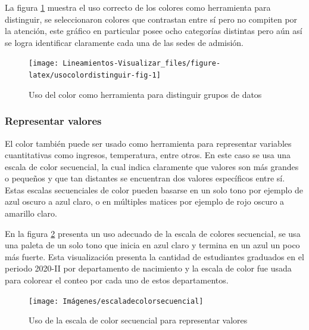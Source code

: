 \documentclass[
]{book}
\begin{document}
La figura \ref{fig:usocolordistinguir-fig} muestra el uso correcto de los colores como herramienta para distinguir, se seleccionaron colores que contrastan entre sí pero no compiten por la atención, este gráfico en particular posee ocho categorías distintas pero aún así se logra identificar claramente cada una de las sedes de admisión.

\begin{figure}

{\centering \texttt{[image: Lineamientos-Visualizar\_files/figure-latex/usocolordistinguir-fig-1]} 

}

\caption{Uso del color como herramienta para distinguir grupos de datos}\label{fig:usocolordistinguir-fig}
\end{figure}

\hypertarget{representar-valores}{%
\subsubsection{Representar valores}\label{representar-valores}}

El color también puede ser usado como herramienta para representar variables cuantitativas como ingresos, temperatura, entre otros. En este caso se usa una escala de color secuencial, la cual indica claramente que valores son más grandes o pequeños y que tan distantes se encuentran dos valores específicos entre sí. Estas escalas secuenciales de color pueden basarse en un solo tono por ejemplo de azul oscuro a azul claro, o en múltiples matices por ejemplo de rojo oscuro a amarillo claro.

En la figura \ref{fig:usocolorrepresentar-fig} presenta un uso adecuado de la escala de colores secuencial, se usa una paleta de un solo tono que inicia en azul claro y termina en un azul un poco más fuerte. Esta visualización presenta la cantidad de estudiantes graduados en el periodo 2020-II por departamento de nacimiento y la escala de color fue usada para colorear el conteo por cada uno de estos departamentos.

\begin{figure}

{\centering \texttt{[image: Imágenes/escaladecolorsecuencial]} 

}

\caption{Uso de la escala de color secuencial para representar valores}\label{fig:usocolorrepresentar-fig}
\end{figure}
\end{document}
